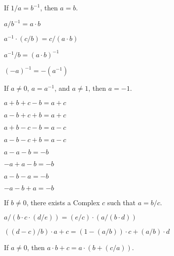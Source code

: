 \documentclass{article}
\begin{document}
\begin{thm}
\item\label{xcmplx1:218} If $1/a=b^{-1}$, then $a=b$.
  \bigbreak
\item\label{xcmplx1:219} $a/b^{-1}=a\cdot b$
\item\label{xcmplx1:220} $a^{-1}\cdot(c/b)=c/(a\cdot b)$
\item\label{xcmplx1:221} $a^{-1}/b=(a\cdot b)^{-1}$
  \bigbreak
\item\label{xcmplx1:222} $(-a)^{-1}=-(a^{-1})$
\item\label{xcmplx1:223} If $a\neq0$, $a=a^{-1}$, and $a\neq1$, then $a=-1$.
\item\label{xcmplx1:224} $a+b+c-b=a+c$
\item\label{xcmplx1:225} $a-b+c+b=a+c$
\item\label{xcmplx1:226} $a+b-c-b=a-c$
\item\label{xcmplx1:227} $a-b-c+b=a-c$
\item\label{xcmplx1:228} $a-a-b=-b$
\item\label{xcmplx1:229} $-a+a-b=-b$
\item\label{xcmplx1:230} $a-b-a=-b$
\item\label{xcmplx1:231} $-a-b+a=-b$
  \bigbreak
\item\label{xcmplx1:232} If $b\neq0$, there exists a Complex $c$ such
  that $a=b/c$.
\item\label{xcmplx1:233} $a/(b\cdot c\cdot(d/e))=(e/c)\cdot(a/(b\cdot d))$
\item\label{xcmplx1:234} $((d-c)/b)\cdot a + c=(1-(a/b))\cdot c + (a/b)\cdot d$
\item\label{xcmplx1:235} If $a\neq0$, then $a\cdot b+c=a\cdot(b+(c/a))$.
\end{thm}
\end{document}
